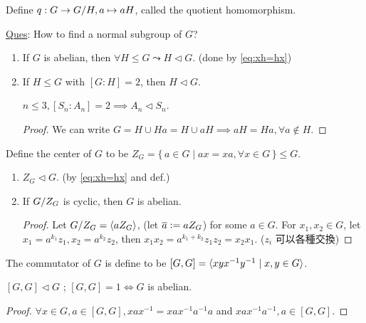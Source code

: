 \begin{remark}
  Define $q: G \to {G}/{H}, a \mapsto aH$, called the quotient homomorphism.
\end{remark}

\underline{Ques}: How to find a normal subgroup of $G$?

\begin{prop} \mbox{}
  \begin{enumerate}
    \item If $G$ is abelian, then $\forall H \le G \leadsto H \lhd G$.
      (done by \ref{eq:xh=hx})
    \item If $H \le G$ with $[G:H] = 2$, then $H \lhd G$.
      \begin{example}
        $n \le 3, [S_n:A_n] = 2 \implies A_n \lhd S_n$.
      \end{example}
      \begin{proof}
        We can write $G = H \cup Ha = H \cup aH \implies aH = Ha,
        \forall a \not\in H$.
      \end{proof}
  \end{enumerate}
\end{prop}

\begin{definition}
  Define the center of $G$ to be $Z_G = \{\, a \in G
  \mid ax = xa, \forall x \in G \,\} \le G$.
\end{definition}

\begin{prop} \mbox{}
  \begin{enumerate}
    \item $Z_G \lhd G$. (by \ref{eq:xh=hx} and def.)
    \item If ${G}/{Z_G}$ is cyclic, then $G$ is abelian.
      \begin{proof}
        Let ${G}/{Z_G} = \langle aZ_G\rangle$, (let $\overline{a} \vcentcolon= aZ_G$) for some
        $a \in G$.
        For $x_1, x_2 \in G$, let $x_1 = a^{k_1}z_1, x_2 = a^{k_2}z_2$, then
        $x_1x_2 = a^{k_1+k_2}z_1z_2 = x_2x_1$. ($z_i$ 可以各種交換)
      \end{proof}
  \end{enumerate}
\end{prop}

\begin{definition}
  The commutator of $G$ is define to be $[G,G] = \langle xyx^{-1}y^{-1} \mid
  x,y \in G\rangle$.
\end{definition}

\begin{prop}
  $[G,G] \lhd G$ ; $[G,G] = 1 \iff G$ is abelian.
  \begin{proof}
    $\forall x \in G, a \in [G,G], xax^{-1} = xax^{-1}a^{-1}a$ and
    $xax^{-1}a^{-1}, a \in [G,G]$.
  \end{proof}
\end{prop}

